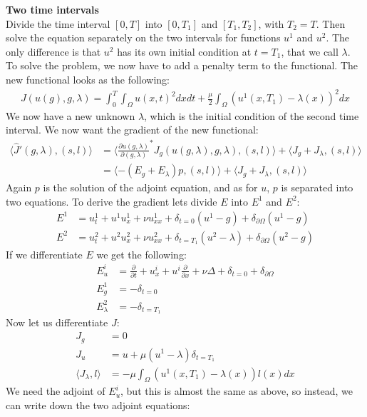 \documentclass[11pt,a4paper]{report}
\begin{document}
\textbf{Two time intervals}
\\
Divide the time interval $[0,T]$ into $[0,T_1]$ and $[T_1,T_2]$, with $T_2=T$. Then solve the equation separately on the two intervals for functions $u^1$ and $u^2$. The only difference is that $u^2$ has its own initial condition at $t=T_1$, that we call $\lambda$. To solve the problem, we now have to add a penalty term to the functional. The new functional looks as the following:
\begin{align*}
J(u(g),g,\lambda) = \int_0^T\int_{\Omega} u(x,t)^2 dxdt + \frac{\mu}{2}\int_{\Omega} (u^1(x,T_1)-\lambda(x))^2dx
\end{align*} 
We now have a new unknown $\lambda$, which is the initial condition of the second time interval. We now want the gradient of the new functional:
\begin{align*}
\langle \hat{J}'(g,\lambda), (s,l)\rangle &= \langle \frac{\partial u(g,\lambda)}{\partial(g,\lambda)}^* J_g(u(g,\lambda),g,\lambda), (s,l)\rangle + \langle J_g+J_{\lambda}, (s,l)\rangle \\
&=\langle -(E_g+E_{\lambda})p , (s,l)\rangle + \langle J_g+J_{\lambda}, (s,l)\rangle
\end{align*}
Again $p$ is the solution of the adjoint equation, and as for $u$, $p$ is separated into two equations. To derive the gradient lets divide $E$ into $E^1$ and $E^2$:
\begin{align*}
E^1 &= u_t^1 + u^1u_x^1 + \nu u_{xx}^1 +\delta_{t=0}(u^1-g) + \delta_{\partial \Omega}(u^1-g)\\
E^2 &= u_t^2 + u^2u_x^2 + \nu u_{xx}^2 +\delta_{t=T_1}(u^2-\lambda) + \delta_{\partial \Omega}(u^2-g)
\end{align*} 
If we differentiate $E$ we get the following:
\begin{align*}
E_u^i&=\frac{\partial}{\partial t} + u_x^i + u^i\frac{\partial}{\partial x} + \nu\Delta + \delta_{t=0} + \delta_{\partial \Omega} \\
E_g^1 &= -\delta_{t=0} \\
E_{\lambda}^2 &= -\delta_{t=T_1}
\end{align*}
Now let us differentiate $J$:
\begin{align*}
J_g &= 0 \\
J_u &= u + \mu(u^1-\lambda)\delta_{t=T_1}\\
\langle J_{\lambda},l\rangle &= -\mu\int_{\Omega} (u^1(x,T_1)-\lambda(x))l(x)dx
\end{align*}
We need the adjoint of $E_u^i$, but this is almost the same as above, so instead, we can write down the two adjoint equations:
\end{document}
